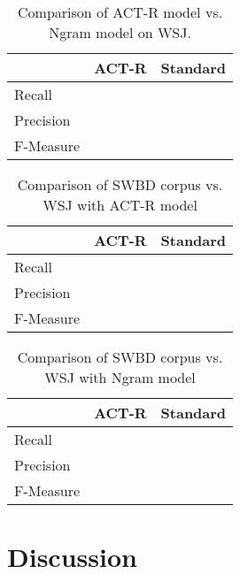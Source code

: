 \documentclass[11pt]{article}
\begin{document}
\begin{table}[h]
\begin{center}
\begin{tabular}{|l|cc|}
\hline
 &ACT-R&Standard \\
\hline
Recall &  &  \\
\hline
Precision & & \\
\hline
F-Measure && \\
\hline
\end{tabular}
\end{center}
\caption{\label{swbd-results} Comparison of ACT-R model vs. Ngram model on WSJ. }
\end{table}

\begin{table}[h]
\begin{center}
\begin{tabular}{|l|cc|}
\hline
 &ACT-R&Standard \\
\hline
Recall &  &  \\
\hline
Precision & & \\
\hline
F-Measure && \\
\hline
\end{tabular}
\end{center}
\caption{\label{swbd-results} Comparison of SWBD corpus vs. WSJ with ACT-R model}
\end{table}

\begin{table}[h]
\begin{center}
\begin{tabular}{|l|cc|}
\hline
 &ACT-R&Standard \\
\hline
Recall &  &  \\
\hline
Precision & & \\
\hline
F-Measure && \\
\hline
\end{tabular}
\end{center}
\caption{\label{swbd-results} Comparison of SWBD corpus vs. WSJ with Ngram model}
\end{table}

\section{Discussion}
\end{document}
